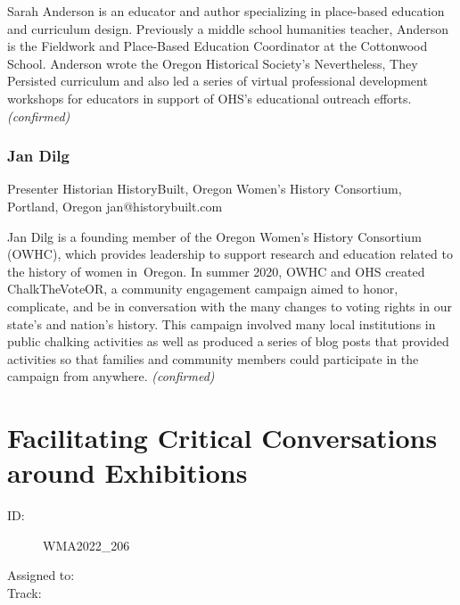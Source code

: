 \documentclass{report}
\begin{document}
                

                Sarah Anderson is an educator and author specializing in place-based education and curriculum design. Previously a middle school humanities teacher, Anderson is the Fieldwork and Place-Based Education Coordinator at the Cottonwood School. Anderson wrote the Oregon Historical Society’s Nevertheless, They Persisted curriculum and also led a series of virtual professional development workshops for educators in support of OHS’s educational outreach efforts.
                \emph{ (confirmed) }
              

              
                \subsubsection*{ Jan Dilg }
                Presenter\newline
                Historian\newline
                HistoryBuilt, Oregon Women’s History Consortium, Portland, Oregon
                \newline
                jan@historybuilt.com\newline
                
                

                Jan Dilg is a founding member of the Oregon Women’s History Consortium (OWHC), which provides leadership to support research and education related to the history of women in Oregon. In summer 2020, OWHC and OHS created ChalkTheVoteOR, a community engagement campaign aimed to honor, complicate, and be in conversation with the many changes to voting rights in our state’s and nation’s history. This campaign involved many local institutions in public chalking activities as well as produced a series of blog posts that provided activities so that families and community members could participate in the campaign from anywhere.
                \emph{ (confirmed) }
              

              
        
          \newpage
          \section{ Facilitating Critical Conversations around Exhibitions  }
            \begin{description}
              \item [ID:]
              WMA2022\_206

              \item [Assigned to:]
                \item [Track:]
              \end{description}
\end{document}

